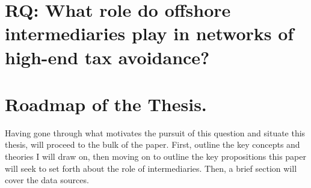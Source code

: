 \section{RQ: What role do offshore intermediaries play in networks of high-end tax avoidance?}
\label{sec:1_5}

\section{Roadmap of the Thesis.}
\label{sec:1_6}

Having gone through what motivates the pursuit of this question and situate this thesis, will proceed to the bulk of the paper. First, outline the key concepts and theories I will draw on, then moving on to outline the key propositions this paper will seek to set forth about the role of intermediaries. Then, a brief section will cover the data sources. 
